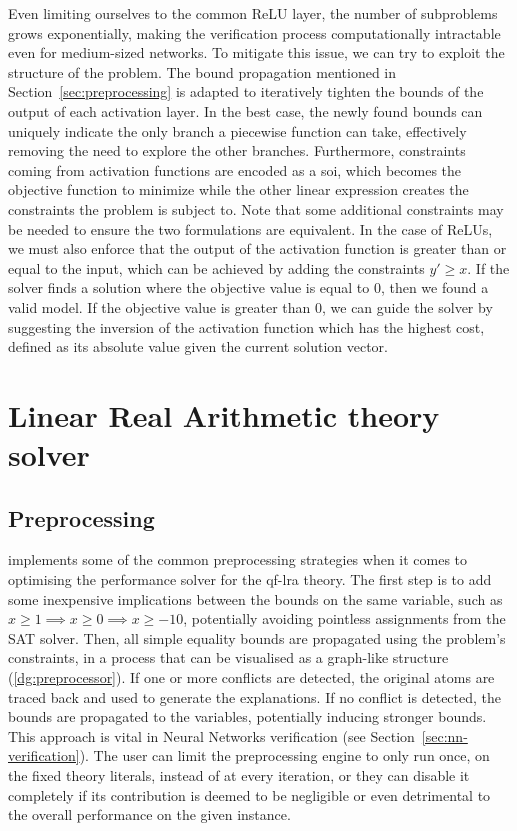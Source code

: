 \documentclass[runningheads]{llncs}
\begin{document}
Even limiting ourselves to the common ReLU layer, the number of subproblems grows exponentially, making the verification process computationally intractable even for medium-sized networks.
To mitigate this issue, we can try to exploit the structure of the problem.
The bound propagation mentioned in Section~\ref{sec:preprocessing} is adapted to iteratively tighten the bounds of the output of each activation layer.
In the best case, the newly found bounds can uniquely indicate the only branch a piecewise function can take, effectively removing the need to explore the other branches.
Furthermore, constraints coming from activation functions are encoded as a \gls{soi}, which becomes the objective function to minimize while the other linear expression creates the constraints the problem is subject to.
Note that some additional constraints may be needed to ensure the two formulations are equivalent.
In the case of ReLUs, we must also enforce that the output of the activation function is greater than or equal to the input, which can be achieved by adding the constraints $y' \ge x$.
If the solver finds a solution where the objective value is equal to $0$, then we found a valid model.
If the objective value is greater than $0$, we can guide the solver by suggesting the inversion of the activation function which has the highest cost, defined as its absolute value given the current solution vector.

\section{Linear Real Arithmetic theory solver}
\label{sec:lra-theory-solver}

\subsection*{Preprocessing}
\label{sec:preprocessing}

\dlinear implements some of the common preprocessing strategies when it comes to optimising the performance solver for the \gls{qf-lra} theory.
The first step is to add some inexpensive implications between the bounds on the same variable, such as $x \ge 1 \implies x \ge 0 \implies x \ge -10$, potentially avoiding pointless assignments from the SAT solver.
Then, all simple equality bounds are propagated using the problem's constraints, in a process that can be visualised as a graph-like structure (\autoref{dg:preprocessor}).
If one or more conflicts are detected, the original atoms are traced back and used to generate the explanations.
If no conflict is detected, the bounds are propagated to the variables, potentially inducing stronger bounds.
This approach is vital in Neural Networks verification (see Section~\ref{sec:nn-verification}).
The user can limit the preprocessing engine to only run once, on the fixed theory literals, instead of at every iteration, or they can disable it completely if its contribution is deemed to be negligible or even detrimental to the overall performance on the given instance.
\end{document}
